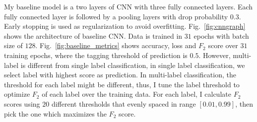 \documentclass[11pt,oneside,a4paper]{article}
\begin{document}
My baseline model is a two layers of CNN with three fully connected  layers. Each fully connected layer is followed by a pooling layers with drop probability $0.3$. Early stopping is used as regularization to avoid overfitting. Fig.~\ref{fig:cnngraph} shows the architecture of baseline CNN. Data is trained in $31$ epochs with batch size of $128$. Fig.~\ref{fig:baseline_metrics} shows accuracy, loss and $F_2$ score over $31$ training epochs, where the tagging threshold of prediction is $0.5$. However, multi-label is different from single label classification, in single label classification, we select label with highest score as prediction. In multi-label classification, the threshold for each label might be different, thus, I tune the label threshold to optimize $F_2$ of each label over the training data. For each label, I calculate $F_2$ scores using $20$ different thresholds that evenly spaced in range $[0.01, 0.99]$, then pick the one which maximizes the $F_2$ score.
\end{document}
